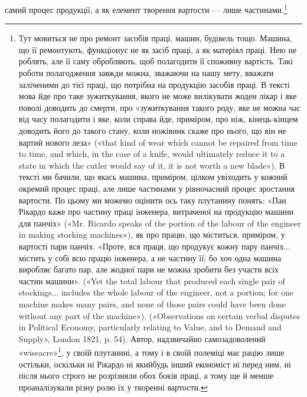 \parcont{}  %
самий процес продукції, а як елемент творення вартости — лише
частинами.\footnote{
Тут мовиться не про ремонт засобів праці, машин, будівель тощо.
Машина, що її ремонтують, функціонує не як засіб праці, а як матеріял
праці. Нею не роблять, але її саму обробляють, щоб полагодити її споживну
вартість. Такі роботи полагодження завжди можна, зважаючи
на нашу мету, вважати заліченими до тієї праці, що потрібна на продукцію
засобів праці. В тексті мова йде про таке зужиткування, якого не може
вилікувати жоден лікар і яке поволі доводить до смерти, про «зужиткування
такого роду, яке не можна час від часу полагодити і яке, коли справа
йде, приміром, про ніж, кінець-кінцем доводить його до такого стану,
коли ножівник скаже про нього, що він не вартий нового леза» («that
kind of wear which cannot be repaired from time to time, and which, in the
case of a knife, would ultimately reduce it to a state in which the cutler
would say of it, it is not worth a new blade»). В тексті ми бачили, що якась
машина, приміром, цілком увіходить у кожний окремий процес праці,
але лише частинами у рівночасний процес зростання вартости. По цьому
ми можемо оцінити ось таку плутанину понять: «Пан Рікардо каже про
частину праці інженера, витраченої на продукцію машини для панчіх»
(«Mr. Ricardo speaks of the portion of the labour of the engineer in making
stocking machines»), як про працю, що міститься, приміром, у вартості
пари панчіх. «Проте, вся праця, що продукує кожну пару панчіх... містить
у собі всю працю інженера, а не частину її; бо хоч одна машина виробляє
багато пар, але жодної пари не можна зробити без участи всіх частин
машини». («Yet the total labour that produced each single pair of stockings...
includes the whole labour of the engineer, not a portion; for one
machine makes many pairs, and none of those pairs could have been done
without any part of the machine»). («Observations on certain verbal disputes
in Political Economy, particularly relating to Value, and to Demand and
Supply», London 1821, p. 54). Автор, надзвичайно самозадоволений
«wiseacre»\footnote*{
— удаваний мудрак, самозадоволений дурень. \emph{Ред.}
}, у своїй плутанині, а тому і в своїй полеміці має рацію лише
остільки, оскільки ні Рікардо ні якийбудь інший економіст ні перед
ним, ні після нього строго не розрізняли обох боків праці, а тому ще
й менше проаналізували різну ролю їх у творенні вартости.
}


